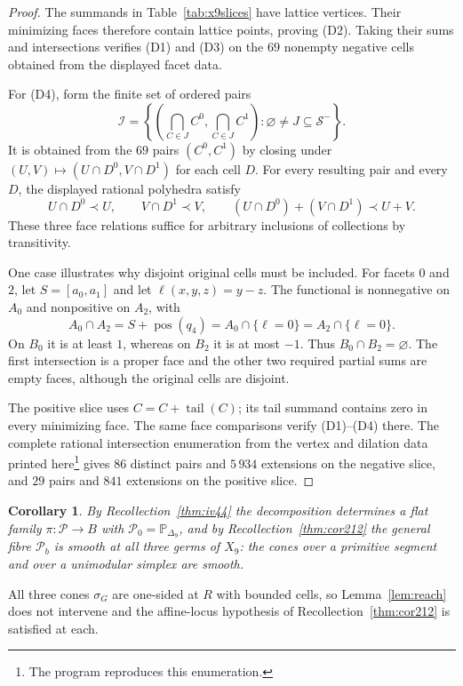 \documentclass[11pt]{amsart}
\newtheorem{corollary}[theorem]{Corollary}
\theoremstyle{definition}
\theoremstyle{remark}
\theoremstyle{plain}
\newcommand{\PP}{\mathbb{P}}
\newcommand{\cP}{\mathcal{P}}
\newcommand{\tail}{\operatorname{tail}}
\begin{document}
\begin{proof}
The summands in Table~\ref{tab:x9slices} have lattice vertices.
Their minimizing faces therefore contain lattice points, proving
(D2).  Taking their sums and intersections verifies (D1) and (D3)
on the $69$ nonempty negative cells obtained from the displayed
facet data.

For (D4), form the finite set of ordered pairs
\[
\mathcal I=\left\{\left(\bigcap_{C\in J}C^0,
\bigcap_{C\in J}C^1\right):
\varnothing\ne J\subseteq\mathcal S^-\right\}.
\]
It is obtained from the $69$ pairs $(C^0,C^1)$ by closing under
$(U,V)\mapsto(U\cap D^0,V\cap D^1)$ for each cell $D$.
For every resulting pair and every $D$, the displayed rational
polyhedra satisfy
\[
U\cap D^0\prec U,\qquad V\cap D^1\prec V,\qquad
(U\cap D^0)+(V\cap D^1)\prec U+V.
\]
These three face relations suffice for arbitrary inclusions of
collections by transitivity.

One case illustrates why disjoint original cells must be included.
For facets $0$ and $2$, let $S=[a_0,a_1]$ and let
$\ell(x,y,z)=y-z$.  The functional is nonnegative on $A_0$ and
nonpositive on $A_2$, with
\[
A_0\cap A_2=S+\operatorname{pos}(q_4)
=A_0\cap\{\ell=0\}=A_2\cap\{\ell=0\}.
\]
On $B_0$ it is at least $1$, whereas on $B_2$ it is at most $-1$.
Thus $B_0\cap B_2=\varnothing$.  The first intersection is a
proper face and the other two required partial sums are empty
faces, although the original cells are disjoint.

The positive slice uses $C=C+\tail(C)$; its tail summand contains
zero in every minimizing face.  The same face comparisons verify
(D1)--(D4) there.  The complete rational intersection enumeration
from the vertex and dilation data printed here\footnote{The program
 reproduces this enumeration.}
gives $86$ distinct pairs
and $5\,934$ extensions on the negative slice, and $29$ pairs
and $841$ extensions on the positive slice.
\end{proof}

\begin{corollary}\label{cor:ambientsmooth}
By Recollection~\ref{thm:iv44} the decomposition determines a flat family
$\pi \colon \cP \to B$ with $\cP_0 = \PP_{\Delta_9}$, and by
Recollection~\ref{thm:cor212} the general fibre $\cP_b$ is smooth at all three germs
of $X_9$: the cones over a primitive segment and over a unimodular simplex are
smooth.
\end{corollary}

All three cones $\sigma_G$ are one-sided at $R$ with bounded cells, so
Lemma~\ref{lem:reach} does not intervene and the affine-locus hypothesis of
Recollection~\ref{thm:cor212} is satisfied at each.
\end{document}
